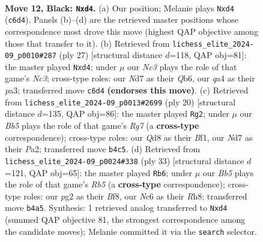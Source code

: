 \documentclass[11pt]{article}
\begin{document}
\clearpage

\begin{figure}[p]\centering
\begin{subfigure}{0.46\textwidth}\centering
\resizebox{\linewidth}{!}{%
\newchessgame
\chessboard[
  setfen={r1bqk3/pp1n1pp1/2n1p3/3pP3/Qb1P1P1r/8/PP1N2PP/R1B1K1NR b KQq - 0 12},
  showmover=false,
  pgfstyle=straightmove, color=movearrow, markmove={c6-d4}
]}
\caption{}
\end{subfigure}\hfill
\begin{subfigure}{0.46\textwidth}\centering
\resizebox{\linewidth}{!}{%
\newchessgame
\chessboard[
  setfen={r1b3k1/pp1n2pp/1qn1p3/3pP3/1b1P4/P1N2QP1/1P5P/R1B1KB1R b KQ - 0 14},
  showmover=false,
  pgfstyle=straightmove, color=movearrow, markmove={c6-d4}
]}
\caption{}
\end{subfigure}
\\[4pt]
\begin{subfigure}{0.46\textwidth}\centering
\resizebox{\linewidth}{!}{%
\newchessgame
\chessboard[
  setfen={r1b1k2r/pp1n1pRp/2p1pq2/3p4/2PP4/2N1P3/PPQ2P1b/R1B1KB2 w Qkq - 1 11},
  showmover=false,
  pgfstyle=straightmove, color=movearrow, markmove={g7-g2}
]}
\caption{}
\end{subfigure}\hfill
\begin{subfigure}{0.46\textwidth}\centering
\resizebox{\linewidth}{!}{%
\newchessgame
\chessboard[
  setfen={2nqkb1r/p1pn2pp/5p2/Q2Pp3/1rP3b1/1P2PNP1/P5BP/RNB1K2R b KQk - 4 17},
  showmover=false,
  pgfstyle=straightmove, color=movearrow, markmove={b4-b6}
]}
\caption{}
\end{subfigure}
\caption{\textbf{Move 12, Black: \texttt{Nxd4}.} (a) Our position; Melanie plays \texttt{Nxd4} (\texttt{c6d4}). Panels (b)--(d) are the retrieved master positions whose correspondence most drove this move (highest QAP objective among those that transfer to it). (b) Retrieved from \texttt{lichess\_elite\_2024-09\_p0010\#287} (ply 27) [structural distance $d$=118, QAP obj=81]: the master played \texttt{Nxd4}; under $\mu$ our \emph{Nc3} plays the role of that game's \emph{Nc3}; cross-type roles: our \emph{N}d7 as their \emph{Q}b6, our \emph{q}a4 as their \emph{p}a3; transferred move \texttt{c6d4} \textbf{(endorses this move)}. (c) Retrieved from \texttt{lichess\_elite\_2024-09\_p0013\#2699} (ply 20) [structural distance $d$=135, QAP obj=86]: the master played \texttt{Rg2}; under $\mu$ our \emph{Bb5} plays the role of that game's \emph{Rg7} (a \textbf{cross-type} correspondence); cross-type roles: our \emph{Q}d8 as their \emph{B}f1, our \emph{N}d7 as their \emph{P}a2; transferred move \texttt{b4c5}. (d) Retrieved from \texttt{lichess\_elite\_2024-09\_p0024\#338} (ply 33) [structural distance $d$=121, QAP obj=65]: the master played \texttt{Rb6}; under $\mu$ our \emph{Bb5} plays the role of that game's \emph{Rb5} (a \textbf{cross-type} correspondence); cross-type roles: our \emph{p}g2 as their \emph{B}f8, our \emph{N}c6 as their \emph{R}h8; transferred move \texttt{b4a5}. Synthesis: 1 retrieved analog transferred to \texttt{Nxd4} (summed QAP objective 81, the strongest correspondence among the candidate moves); Melanie committed it via the \texttt{search} selector.}
\label{fig:thought-m23}
\end{figure}
\end{document}
